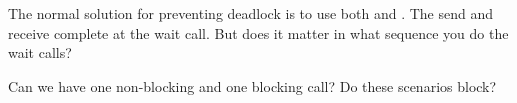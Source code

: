\begin{enumerate}
  The normal solution for preventing deadlock is to use both
   and . The send and
  receive complete at the wait call. But does it matter in what
  sequence you do the wait calls?
  \begin{multicols}{2}
    \columnbreak
  \end{multicols}

  Can we have one non-blocking and one blocking call?
  Do these scenarios block?
  \begin{multicols}{2}
    \columnbreak
  \end{multicols}
\end{enumerate}

